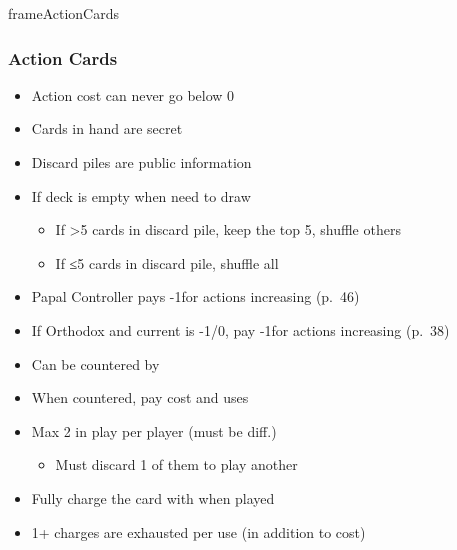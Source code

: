 \documentclass[10pt]{article}
\newlength{\fhActionCards} \setlength\fhActionCards{15\baselineskip}
\begin{document}
\begin{dynamiccontents*}{frameActionCards}\begin{eubox}{\fhActionCards}
	\begin{multicols}{2}
		\subsubsection*{Action Cards }
		\begin{itemize}
			\item Action cost can never go below 0
			\item Cards in hand are secret
			\item Discard piles are public information
			\item If deck is empty when need to draw 
			\begin{itemize}
				\item If >5 cards in discard pile, keep the top 5, shuffle others
				\item If ≤5 cards in discard pile, shuffle all
			\end{itemize}
			\item Papal Controller pays -1\adminpower for actions increasing \stability (p.~46)
			\item If Orthodox and current \stability is -1/0, pay -1\adminpower for actions increasing \stability (p.~38)
		\end{itemize}
		\begin{itemize}
			\item Can be countered by 
			\item When countered, pay cost and \displaycard uses 
		\end{itemize}
		\begin{itemize}
			\item Max 2 in play per player (must be diff.)
			\begin{itemize}
				\item Must discard 1 of them to play another
			\end{itemize}
			\item Fully charge the card with \cubes when played
			\item 1+ charges are exhausted per use (in addition to \monarchpower cost)
		\end{itemize}
		\begin{itemize}

\end{itemize}
\end{multicols}
\end{eubox}
\end{dynamiccontents*}
\end{document}
